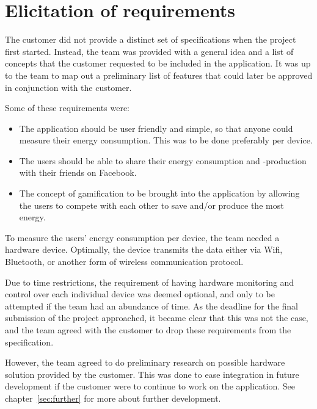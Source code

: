 \section{Elicitation of requirements}
\label{sec:obtainingreq}

The customer did not provide a distinct set of specifications when the project first started. Instead, the team was provided with a general idea and a list of concepts that the customer requested to be included in the application. It was up to the team to map out a preliminary list of features that could later be approved in conjunction with the customer. 

Some of these requirements were:
\begin{itemize}
\item The application should be user friendly and simple, so that anyone could measure their energy consumption. This was to be done preferably per device. 
\item The users should be able to share their energy consumption and -production with their friends on \gls{Facebook}. 
\item The concept of \gls{gamification} to be brought into the application by allowing the users to compete with each other to save and/or produce the most energy. 
\end{itemize}

\noindent To measure the users' energy consumption per device, the team needed a hardware device. Optimally, the device transmits the data either via Wifi, Bluetooth, or another form of wireless communication protocol.

Due to time restrictions, the requirement of having hardware monitoring and control over each individual device was deemed optional, and only to be attempted if the team had an abundance of time. As the deadline for the final submission of the project approached, it became clear that this was not the case, and the team agreed with the customer to drop these requirements from the specification. 

However, the team agreed to do preliminary research on possible hardware solution provided by the customer. This was done to ease integration in future development if the customer were to continue to work on the application. See chapter~\ref{sec:further} for more about further development.
 
